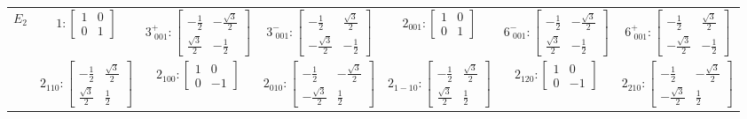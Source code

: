 \documentclass[fleqn,8pt,landscape]{jsarticle}
\begin{document}
\begin{longtable}{ccccccc}
$ E_{2} $ & $ 1:\begin{bmatrix} 1 & 0 \\ 0 & 1 \end{bmatrix} $ & $ 3^{+}_{\,\,001}:\begin{bmatrix} - \frac{1}{2} & - \frac{\sqrt{3}}{2} \\ \frac{\sqrt{3}}{2} & - \frac{1}{2} \end{bmatrix} $ & $ 3^{-}_{\,\,001}:\begin{bmatrix} - \frac{1}{2} & \frac{\sqrt{3}}{2} \\ - \frac{\sqrt{3}}{2} & - \frac{1}{2} \end{bmatrix} $ & $ 2{}_{001}:\begin{bmatrix} 1 & 0 \\ 0 & 1 \end{bmatrix} $ & $ 6^{-}_{\,\,001}:\begin{bmatrix} - \frac{1}{2} & - \frac{\sqrt{3}}{2} \\ \frac{\sqrt{3}}{2} & - \frac{1}{2} \end{bmatrix} $ & $ 6^{+}_{\,\,001}:\begin{bmatrix} - \frac{1}{2} & \frac{\sqrt{3}}{2} \\ - \frac{\sqrt{3}}{2} & - \frac{1}{2} \end{bmatrix} $ \\
& $ 2{}_{110}:\begin{bmatrix} - \frac{1}{2} & \frac{\sqrt{3}}{2} \\ \frac{\sqrt{3}}{2} & \frac{1}{2} \end{bmatrix} $ & $ 2{}_{100}:\begin{bmatrix} 1 & 0 \\ 0 & -1 \end{bmatrix} $ & $ 2{}_{010}:\begin{bmatrix} - \frac{1}{2} & - \frac{\sqrt{3}}{2} \\ - \frac{\sqrt{3}}{2} & \frac{1}{2} \end{bmatrix} $ & $ 2{}_{1-10}:\begin{bmatrix} - \frac{1}{2} & \frac{\sqrt{3}}{2} \\ \frac{\sqrt{3}}{2} & \frac{1}{2} \end{bmatrix} $ & $ 2{}_{120}:\begin{bmatrix} 1 & 0 \\ 0 & -1 \end{bmatrix} $ & $ 2{}_{210}:\begin{bmatrix} - \frac{1}{2} & - \frac{\sqrt{3}}{2} \\ - \frac{\sqrt{3}}{2} & \frac{1}{2} \end{bmatrix} $ \\
\end{longtable}
\end{document}
